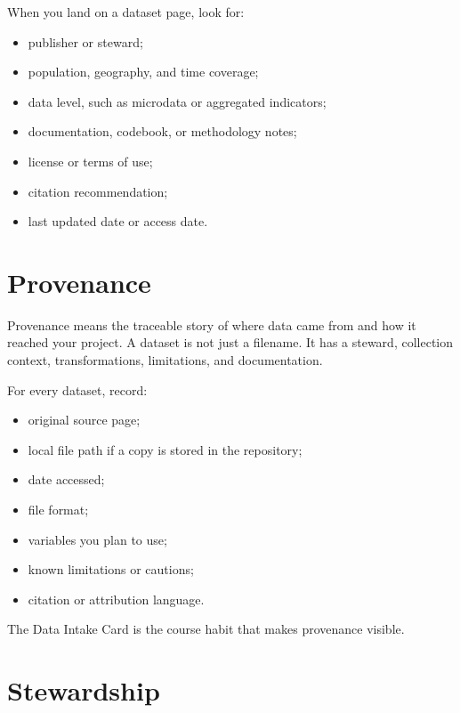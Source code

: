 \documentclass[
  letterpaper,
  DIV=11,
  numbers=noendperiod,
  oneside]{scrreprt}
\providecommand{\tightlist}{%
  \setlength{\itemsep}{0pt}\setlength{\parskip}{0pt}}
\begin{document}
When you land on a dataset page, look for:

\begin{itemize}
\tightlist
\item
  publisher or steward;
\item
  population, geography, and time coverage;
\item
  data level, such as microdata or aggregated indicators;
\item
  documentation, codebook, or methodology notes;
\item
  license or terms of use;
\item
  citation recommendation;
\item
  last updated date or access date.
\end{itemize}

\section*{Provenance}\label{provenance}


Provenance means the traceable story of where data came from and how it
reached your project. A dataset is not just a filename. It has a
steward, collection context, transformations, limitations, and
documentation.

For every dataset, record:

\begin{itemize}
\tightlist
\item
  original source page;
\item
  local file path if a copy is stored in the repository;
\item
  date accessed;
\item
  file format;
\item
  variables you plan to use;
\item
  known limitations or cautions;
\item
  citation or attribution language.
\end{itemize}

The Data Intake Card is the course habit that makes provenance visible.

\section*{Stewardship}\label{stewardship}
\end{document}
